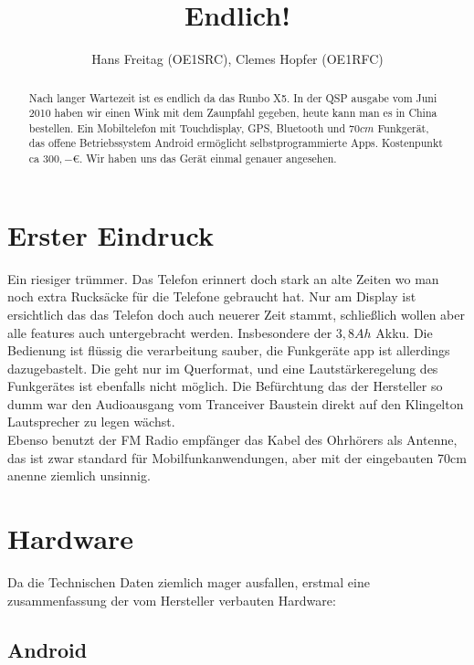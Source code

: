 \documentclass{article}
\begin{document}
\title{Endlich!}
\author{Hans Freitag (OE1SRC), Clemes Hopfer (OE1RFC)}
\maketitle
\begin{abstract}
Nach langer Wartezeit ist es endlich da das Runbo X5. In der QSP ausgabe vom Juni 2010 haben wir einen Wink mit dem Zaunpfahl gegeben, heute 
kann man es in China bestellen. Ein Mobiltelefon mit Touchdisplay, GPS, Bluetooth und $70cm$ Funkgerät, das offene Betriebssystem Android 
ermöglicht selbstprogrammierte Apps. Kostenpunkt ca $300,- \euro$. Wir haben uns das Gerät einmal genauer angesehen. 
\end{abstract}

\section{Erster Eindruck}

Ein riesiger trümmer. Das Telefon erinnert doch stark an alte Zeiten wo man noch extra Rucksäcke für die Telefone gebraucht hat. Nur am Display 
ist ersichtlich das das Telefon doch auch neuerer Zeit stammt, schließlich wollen aber alle features auch untergebracht werden. Insbesondere 
der $3,8 Ah$ Akku. Die Bedienung ist flüssig die verarbeitung sauber, die Funkgeräte app ist allerdings dazugebastelt. Die geht nur im Querformat, 
und eine Lautstärkeregelung des Funkgerätes ist ebenfalls nicht möglich. Die Befürchtung das der Hersteller so dumm war den Audioausgang vom 
Tranceiver Baustein direkt auf den Klingelton Lautsprecher zu legen wächst.\\

Ebenso benutzt der FM Radio empfänger das Kabel des Ohrhörers als Antenne, das ist zwar standard für Mobilfunkanwendungen, aber mit der 
eingebauten 70cm anenne ziemlich unsinnig. \\


\section{Hardware}

Da die Technischen Daten ziemlich mager ausfallen, erstmal eine zusammenfassung der vom Hersteller verbauten Hardware: 

\subsection{Android}
\end{document}
